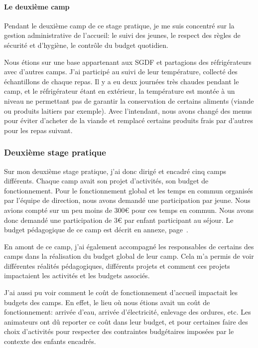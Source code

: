\documentclass[titlepage,11pt,a4paper]{article}
\begin{document}
\paragraph{Le deuxième camp}

Pendant le deuxième camp de ce stage pratique, je me suis concentré sur la gestion
administrative de l'accueil: le suivi des jeunes, le respect des règles de sécurité et
d'hygiène, le contrôle du budget quotidien.

Nous étions sur une base appartenant aux SGDF et partagions des réfrigérateurs avec
d'autres camps. J'ai participé au suivi de leur température, collecté des échantillons de
chaque repas. Il y a eu deux journées très chaudes pendant le camp, et le réfrigérateur
étant en extérieur, la température est montée à un niveau ne permettant pas de garantir la
conservation de certains aliments (viande ou produits laitiers par exemple). Avec
l'intendant, nous avons changé des menus pour éviter d'acheter de la viande et remplacé
certains produits frais par d'autres pour les repas suivant.

\subsubsection{Deuxième stage pratique}


Sur mon deuxième stage pratique, j'ai donc dirigé et encadré cinq camps différents. Chaque camp avait son
projet d'activités, son budget de fonctionnement. Pour le fonctionnement global et les
temps en commun organisés par l'équipe de direction, nous avons demandé une participation
par jeune. Nous avions compté sur un peu moins de 300€ pour ces temps en commun. Nous
avons donc demandé une participation de 3€ par enfant participant au séjour. Le budget
pédagogique de ce camp est décrit en annexe, page~\pageref{budgped}.

En amont de ce camp, j'ai également accompagné les responsables de certains des camps dans
la réalisation du budget global de leur camp. Cela m'a permis de voir différentes
réalités pédagogiques, différents projets et comment ces projets impactaient les activités
et les budgets associés.

J'ai aussi pu voir comment le coût de fonctionnement d'accueil
impactait les budgets des camps. En effet, le lieu où nous étions avait un coût de
fonctionnement: arrivée d'eau, arrivée d'électricité, enlevage des ordures, etc. Les
animateurs ont dû reporter ce coût dans leur budget, et pour certaines faire des choix
d'activités pour respecter des contraintes budgétaires imposées par le contexte des
enfants encadrés.
\end{document}
